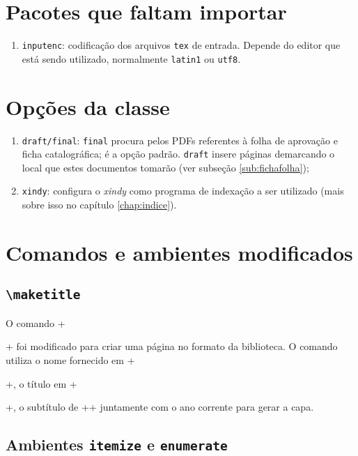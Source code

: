 \documentclass[xindy,rascunho]{fei}
\begin{document}
\section{Pacotes que faltam importar}

    \begin{enumerate}
        \item\texttt{inputenc}: codificação dos arquivos \texttt{tex} de entrada. Depende do editor que está sendo utilizado, normalmente \texttt{latin1} ou \texttt{utf8}.
    \end{enumerate}
    
\section{Opções da classe}
	\begin{enumerate}
	\item \texttt{draft/final}: \texttt{final} procura pelos PDFs referentes à folha de aprovação e ficha catalográfica; é a opção padrão. \texttt{draft} insere páginas demarcando o local que estes documentos tomarão (ver subseção \ref{sub:fichafolha});
	\item \texttt{xindy}: configura o \emph{xindy} como programa de indexação a ser utilizado (mais sobre isso no capítulo \ref{chap:indice}).
	\end{enumerate}

\section{Comandos e ambientes modificados}
    
    \subsection{\texttt{\textbackslash maketitle}}
    
    O comando \latexinline+\maketitle+ foi modificado para criar uma página no formato da biblioteca. O comando utiliza o nome fornecido em \latexinline+\author{}+, o título em \latexinline+\title{}+, o subtítulo de \latexinline+\subtitulo{}+ juntamente com o ano corrente para gerar a capa.

    \subsection{Ambientes \texttt{itemize} e \texttt{enumerate}}
    
\end{document}
